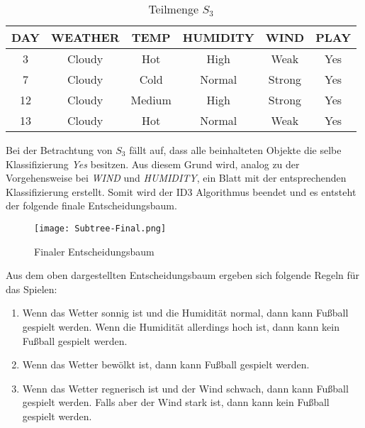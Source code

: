 \begin{table}[htbp]
    \centering
    \begin{tabular}{cccccc}
        \toprule
        \textbf{DAY} & \textbf{WEATHER} & \textbf{TEMP} & \textbf{HUMIDITY} & \textbf{WIND} & \textbf{PLAY} \\
        \toprule
        3   &Cloudy	&Hot	&High	&Weak	&Yes \\
        7   &Cloudy	&Cold	&Normal	&Strong	&Yes \\
        12  &Cloudy	&Medium	&High	&Strong	&Yes \\
        13  &Cloudy	&Hot	&Normal	&Weak	&Yes \\
        \bottomrule
    \end{tabular}
    \caption{Teilmenge $S_{3}$}
    \label{table:datensatz-cloudy}
\end{table}

Bei der Betrachtung von $S_{3}$ fällt auf, dass alle beinhalteten Objekte die selbe Klassifizierung \textit{Yes} besitzen. Aus diesem Grund wird, analog zu der Vorgehensweise bei \textit{WIND} und \textit{HUMIDITY}, ein Blatt mit der entsprechenden Klassifizierung erstellt. Somit wird der ID3 Algorithmus beendet und es entsteht der folgende finale Entscheidungsbaum.

\begin{figure}[H]
    \centering
    \texttt{[image: Subtree-Final.png]}
    \caption{Finaler Entscheidungsbaum}
\end{figure}

Aus dem oben dargestellten Entscheidungsbaum ergeben sich folgende Regeln für das Spielen: 

\begin{enumerate}
    \item Wenn das Wetter sonnig ist und die Humidität normal, dann kann Fußball gespielt werden. Wenn die Humidität allerdings hoch ist, dann kann kein Fußball gespielt werden. \autocite{ImplementationID3}
    \item Wenn das Wetter bewölkt ist, dann kann Fußball gespielt werden. \autocite{ImplementationID3}
    \item Wenn das Wetter regnerisch ist und der Wind schwach, dann kann Fußball gespielt werden. Falls aber der Wind stark ist, dann kann kein Fußball gespielt werden. \autocite{ImplementationID3}
\end{enumerate}

\pagebreak